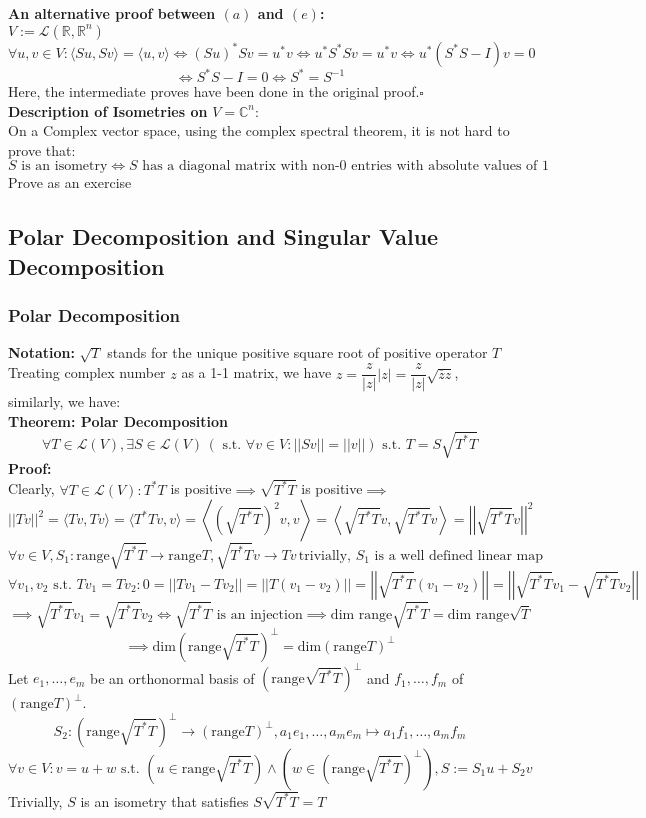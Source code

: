 \documentclass{article}
\newcommand{\R}{\mathbb{R}}
\newcommand{\st}{\mbox{ s.t. }}
\newcommand{\0}{{\bf{0}}}
\begin{document}
\textbf{An alternative proof between $(a)$ and $(e)$:}\\
$V:=\mathcal{L}(\R,\R^n)$
$$\forall u,v\in V:\langle Su,Sv\rangle=\langle u,v\rangle\iff(Su)^*Sv=u^*v\iff u^*S^*Sv=u^*v\iff u^*(S^*S-I)v=0$$
$$\iff S^*S-I=0\iff S^*=S^{-1}$$
Here, the intermediate proves have been done in the original proof.\quad$\square$\\
\textbf{Description of Isometries on} $V=\mathbb{C}^n$:\\
On a Complex vector space, using the complex spectral theorem, it is not hard to prove that:
$$S\mbox{ is an isometry}\iff\mbox{$S$ has a diagonal matrix with non-0 entries with absolute values of 1}$$
\null\hfill{Prove as an exercise}
\subsection{Polar Decomposition and Singular Value Decomposition}
\subsubsection{Polar Decomposition}
\textbf{Notation:} $\sqrt{T}$ stands for the unique positive square root of positive operator $T$\\
Treating complex number $z$ as a 1-1 matrix, we have $z=\dfrac{z}{|z|}|z|=\dfrac{z}{|z|}\sqrt{\overline{z}z}$, similarly, we have:\\
\textbf{Theorem: Polar Decomposition}
$$\forall T\in\mathcal{L}(V),\exists S\in\mathcal{L}(V)\,(\st\forall v\in V:||Sv||=||v||)\st T=S\sqrt{T^*T}$$
\textbf{Proof:}\\
Clearly, $\forall T\in\mathcal{L}(V):T^*T$ is positive$\implies\sqrt{T^*T}$ is positive$\implies$
$$||Tv||^2=\langle Tv,Tv\rangle=\langle T^*Tv,v\rangle=\left\langle\left(\sqrt{T^*T}\right)^2v,v\right\rangle=\left\langle \sqrt{T^*T}v,\sqrt{T^*T}v\right\rangle=\left|\left|\sqrt{T^*T}v\right|\right|^2$$
$$\forall v\in V,S_1:\mbox{range}\sqrt{T^*T}\to\mbox{range}T,\sqrt{T^*T}v\to Tv\,\mbox{trivially, }S_1\mbox{ is a well defined linear map}$$
$$\forall v_1,v_2\st Tv_1=Tv_2:0=||Tv_1-Tv_2||=||T(v_1-v_2)||=\left|\left|\sqrt{T^*T}(v_1-v_2)\right|\right|=\left|\left|\sqrt{T^*T}v_1-\sqrt{T^*T}v_2\right|\right|$$
$$\implies\sqrt{T^*T}v_1=\sqrt{T^*T}v_2\iff\sqrt{T^*T}\mbox{ is an injection}\implies\mbox{dim range}\sqrt{T^*T}=\mbox{dim range}\sqrt{T}$$
$$\implies\mbox{dim}\left(\mbox{range}\sqrt{T^*T}\right)^\perp=\mbox{dim}\left(\mbox{range}T\right)^\perp$$
Let $e_1,\dots,e_m$ be an orthonormal basis of $\left(\mbox{range}\sqrt{T^*T}\right)^\perp$ and $f_1,\dots,f_m$ of $\left(\mbox{range}T\right)^\perp$.
$$S_2:\left(\mbox{range}\sqrt{T^*T}\right)^\perp\to\left(\mbox{range}T\right)^\perp,a_1e_1,\dots,a_me_m\mapsto a_1f_1,\dots,a_mf_m$$
$$\forall v\in V:v=u+w\st\left(u\in\mbox{range}\sqrt{T^*T}\right)\land\left(w\in\left(\mbox{range}\sqrt{T^*T}\right)^\perp\right),S:=S_1u+S_2v$$
Trivially, $S$ is an isometry that satisfies $S\sqrt{T^*T}=T$
\end{document}
